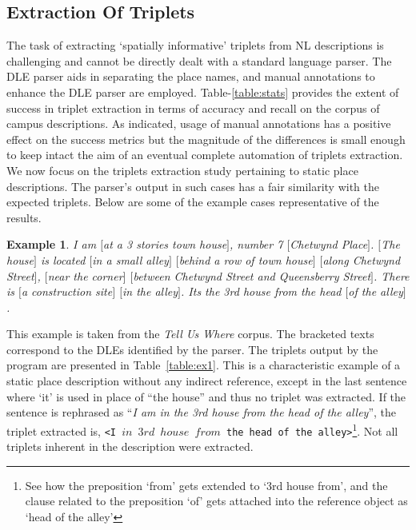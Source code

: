 \documentclass[letter]{sig-alternate}
\begin{document}
\subsection{Extraction Of Triplets}
\label{extraction}
The task of extracting `spatially informative' triplets from NL descriptions is challenging and cannot be directly dealt with a standard language parser. The DLE parser aids in separating the place names, and manual annotations to enhance the DLE parser are employed.
Table-\ref{table:stats} provides the extent of success in triplet extraction in terms of accuracy and recall on the corpus of campus descriptions. As indicated, usage of manual annotations has a positive effect on the success metrics but the magnitude of the differences is small enough to keep intact the aim of an eventual complete automation of triplets extraction. We now focus on the triplets extraction study pertaining to static place descriptions. The parser's output in such cases has a fair similarity with the expected triplets. 
Below are some of the example cases representative of the results. \vspace{-0.05in}
\newtheorem{example}{Example}
\begin{example}
\label{tuwex1}
I am $[$at a 3 stories town house$]$, number 7 $[$Chetwynd Place$]$. $[$The house$]$ is located $[$in a small alley$]$ $[$behind a row of town house$]$ $[$along Chetwynd Street$]$, $[$near the corner$]$ $[$between Chetwynd Street and Queensberry Street$]$. There is $[$a construction site$]$ $[$in the alley$]$. Its the 3rd house from the head $[$of the alley$]$ \vspace{-0.05in}.
\end{example}
This example is taken from the \textit{Tell Us Where} corpus. The bracketed texts correspond to the DLEs identified by the parser. The triplets output by the program are presented in Table~\ref{table:ex1}. This is a characteristic example of a static place description without any indirect reference, except in the last sentence where `it' is used in place of ``the house'' and thus no triplet was extracted. If the sentence is rephrased as ``\textit{I am in the 3rd house from the head of the alley}'', the triplet extracted is, \texttt{<I $in$ $3rd$ $house$ $from$ the head of the alley>}\footnote{See how the preposition `from' gets extended to `3rd house from', and the clause related to the preposition `of' gets attached into the reference object as `head of the alley'}. Not all triplets inherent in the description were extracted. 
\end{document}
